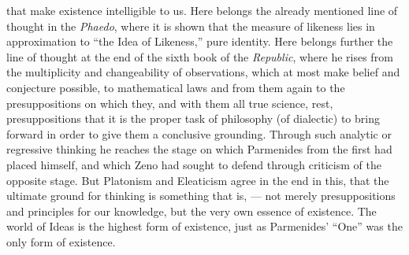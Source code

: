 \documentclass[12pt,a4paper,openany]{book}
\newcommand{\opage}[1]{\marginnote{\footnotesize\textit{[#1]}}}
\begin{document}
that make existence intelligible to us. Here belongs the
\setcounter{footnote}{0}%
\opage{13}already mentioned line of thought in the \textit{Phaedo}, where it is shown that
the measure of likeness lies in approximation to ``the Idea
of Likeness,'' pure identity. Here belongs further
the line of thought at the end of the sixth book of the \textit{Republic}, where
he rises from the multiplicity and changeability of observations,
which at most make belief and conjecture possible,
to mathematical laws and from them again to the presuppositions
on which they, and with them all true science, rest, presuppositions
that it is the proper task of philosophy (of dialectic)
to bring forward in order to give them a conclusive grounding.
Through such analytic or regressive thinking
he reaches the stage on which Parmenides from the first
had placed himself, and which Zeno had sought to defend
through criticism of the opposite stage. But Platonism
and Eleaticism agree in the end in this, that the
ultimate ground for thinking is something that is, --- not
merely presuppositions and principles for our knowledge, but
the very own essence of existence. The world of Ideas is the highest
form of existence, just as Parmenides’ ``One'' was the
only form of existence.
\end{document}
